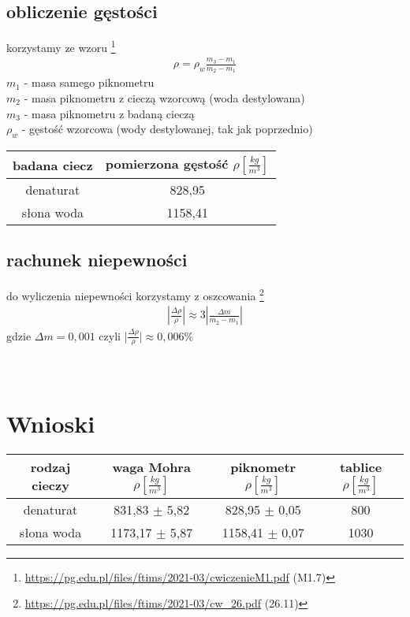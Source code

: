 \documentclass{article}
\begin{document}
\subsection{obliczenie gęstości}

korzystamy ze wzoru \footnote{\url{https://pg.edu.pl/files/ftims/2021-03/cwiczenieM1.pdf} (M1.7)} 
\begin{gather*}
	\rho = \rho_w \frac{m_3 - m_1}{m_2 - m_1}
\end{gather*}
$m_1$ - masa samego piknometru \\
$m_2$ - masa piknometru z cieczą wzorcową (woda destylowana) \\
$m_3$ - masa piknometru z badaną cieczą \\
$\rho_w$ - gęstość wzorcowa (wody destylowanej, tak jak poprzednio)

\begin{center}
\begin{tabular}{ c | c }
badana ciecz & pomierzona gęstość $\rho [\frac{kg}{m^3}]$\\
\hline
 denaturat  & 828,95 \\  
 słona woda & 1158,41
\end{tabular}
\end{center}
\subsection{rachunek niepewności}
do wyliczenia niepewności korzystamy z oszcowania \footnote{\url{https://pg.edu.pl/files/ftims/2021-03/cw_26.pdf} (26.11)} \\
\begin{gather*}
	|\frac{\Delta\rho}{\rho}| \approx 3|\frac{\Delta m}{m_2 - m_1}|
\end{gather*}
gdzie $\Delta m = 0,001$
czyli |$\frac{\Delta\rho}{\rho}|  \approx 0,006\%$
\\ \\ \\
\section{Wnioski}

\begin{center}
\begin{tabular}{ c | c | c | c }
rodzaj cieczy & waga Mohra  $\rho [\frac{kg}{m^3}]$ & piknometr $\rho [\frac{kg}{m^3}]$ & tablice $\rho [\frac{kg}{m^3}] $ \\

\hline
 denaturat  & 831,83 $\pm$ 5,82 &  828,95 $\pm$  0,05& 800\\  
 słona woda & 1173,17 $\pm$ 5,87&1158,41 $\pm$ 0,07 & 1030
\end{tabular}
\end{center}
\end{document}
